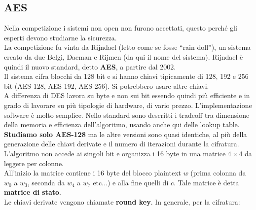 \documentclass[a4paper,12pt, oneside]{book}
\begin{document}
\subsection{AES}
Nella competizione i sistemi non open non furono accettati, questo perché gli
esperti devono studiarne la sicurezza.\\
La competizione fu vinta da Rijndael (letto come se fosse ``rain doll''), un
sistema creato da 
due Belgi, Daeman e Rijmen (da qui il nome del sistema). Rijndael è quindi il
nuovo standard, detto \textbf{AES}, a partire dal 2002.\\
Il sistema cifra blocchi da 128 bit e si hanno chiavi tipicamente di 128, 192 e
256 bit (AES-128, AES-192, AES-256). Si potrebbero usare altre chiavi.\\
A differenza di DES lavora su byte e non sui bit essendo quindi più efficiente e
in grado di lavorare su più tipologie di hardware, di vario
prezzo. L'implementazione software è molto semplice. Nello standard sono
descritti i tradeoff tra dimensione della memoria e efficienza dell'algoritmo,
usando anche qui delle lookup table.\\
\textbf{Studiamo solo AES-128} ma le altre versioni sono quasi identiche, al più
della generazione delle chiavi derivate e il numero di iterazioni durante la
cifratura.\\ 
L'algoritmo non accede ai singoli bit e organizza i 16 byte in una matrice
$4\times 4$ da leggere per colonne.\\
All'inizio la matrice contiene i 16 byte del blocco plaintext $w$ (prima colonna
da $w_0$ a $w_3$, 
seconda da $w_4$ a $w_7$ etc$\ldots$) e alla fine quelli di $c$. Tale matrice è
detta \textbf{matrice di stato}.\\
Le chiavi derivate vengono chiamate \textbf{round key}.
In generale, per la cifratura:
\end{document}
